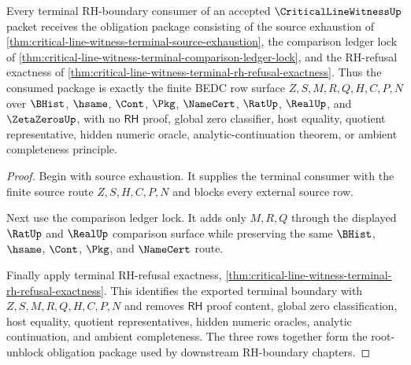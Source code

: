 \begin{theorem}
\label{thm:critical-line-witness-terminal-refusal-package}
Every terminal RH-boundary consumer of an accepted $\CriticalLineWitnessUp$ packet receives the obligation package consisting of the source exhaustion of \autoref{thm:critical-line-witness-terminal-source-exhaustion}, the comparison ledger lock of \autoref{thm:critical-line-witness-terminal-comparison-ledger-lock}, and the RH-refusal exactness of \autoref{thm:critical-line-witness-terminal-rh-refusal-exactness}. Thus the consumed package is exactly the finite BEDC row surface $Z,S,M,R,Q,H,C,P,N$ over $\BHist$, $\hsame$, $\Cont$, $\Pkg$, $\NameCert$, $\RatUp$, $\RealUp$, and $\ZetaZerosUp$, with no $\mathsf{RH}$ proof, global zero classifier, host equality, quotient representative, hidden numeric oracle, analytic-continuation theorem, or ambient completeness principle.
\end{theorem}
\begin{proof}
Begin with source exhaustion. It supplies the terminal consumer with the finite source route $Z,S,H,C,P,N$ and blocks every external source row.

Next use the comparison ledger lock. It adds only $M,R,Q$ through the displayed $\RatUp$ and $\RealUp$ comparison surface while preserving the same $\BHist$, $\hsame$, $\Cont$, $\Pkg$, and $\NameCert$ route.

Finally apply terminal RH-refusal exactness, \autoref{thm:critical-line-witness-terminal-rh-refusal-exactness}. This identifies the exported terminal boundary with $Z,S,M,R,Q,H,C,P,N$ and removes $\mathsf{RH}$ proof content, global zero classification, host equality, quotient representatives, hidden numeric oracles, analytic continuation, and ambient completeness. The three rows together form the root-unblock obligation package used by downstream RH-boundary chapters.
\end{proof}
